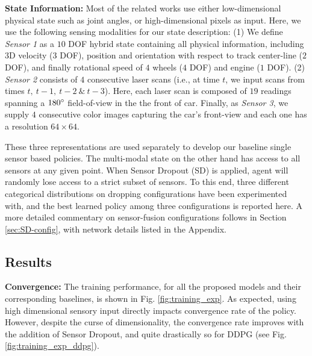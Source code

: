 \documentclass[../thesis.tex]{subfiles}
\begin{document}
\textbf{State Information:}
Most of the related works use either low-dimensional physical state such as joint angles, or high-dimensional pixels as input. Here, we use the following sensing modalities for our state description: (1) We define \emph{Sensor 1} as a $10$ DOF hybrid state containing all physical information, including $3$D velocity ($3$ DOF), position and orientation with respect to track center-line ($2$ DOF), and finally rotational speed of $4$ wheels ($4$ DOF) and engine ($1$ DOF). (2) \emph{Sensor 2} consists of $4$ consecutive laser scans (i.e., at time $t$, we input scans from times $t,~ t-1,~t-2~\&~t-3$). Here, each laser scan is composed of $19$ readings spanning a $180\degree$ field-of-view in the the front of car. Finally, as \emph{Sensor 3}, we supply $4$ consecutive color images capturing the car's front-view and each one has a resolution $64 \times 64$.

These three representations are used separately to develop our baseline single sensor based policies. The multi-modal state on the other hand has access to all sensors at any given point. When Sensor Dropout (SD) is applied, agent will randomly lose access to a strict subset of sensors. To this end, three different categorical distributions on dropping configurations have been experimented with, and the best learned policy among three configurations is reported here. A more detailed commentary on sensor-fusion configurations follows in Section \ref{sec:SD-config}, with network details listed in the Appendix.

\subsection{Results}
\textbf{Convergence:}
The training performance, for all the proposed models and their corresponding baselines, is shown in Fig. \ref{fig:training_exp}. As expected, using high dimensional sensory input directly impacts convergence rate of the policy.
However, despite the curse of dimensionality, the convergence rate improves with the addition of Sensor Dropout, and quite drastically so for DDPG (see Fig. \ref{fig:training_exp_ddpg}).
\end{document}
